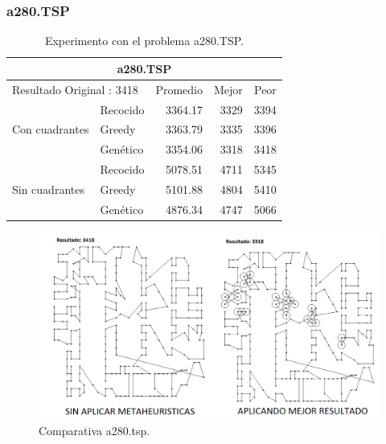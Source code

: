 
\subsubsection{a280.TSP}
\begin{table}[hbtp]
    \centering
    \caption{Experimento con el problema a280.TSP.}    
    \small
    \begin{tabular}{| l   l | r | r | r |   }
    \hline\multicolumn{5}{|c|}{ \rowcolor[gray]{0.8}a280.TSP} \\\hline
    \multicolumn{2}{|l|}{Resultado Original : 3418}   & Promedio & Mejor & Peor \\ 
                \hline
                & Recocido  &  3364.17 & 3329 & \cellcolor[gray]{0.9} 3394  \\ 
Con cuadrantes  & Greedy    &  3363.79 & 3335 & 3396  \\ 
                & Genético  & \cellcolor[gray]{0.9} 3354.06 & \cellcolor[gray]{0.9} 3318 & 3418 \\ 
                    \hline
                & Recocido  &  5078.51 & \cellcolor[gray]{0.9} 4711 & 5345   \\ 
Sin cuadrantes  & Greedy    &  5101.88 & 4804 & 5410   \\ 
                & Genético  &  \cellcolor[gray]{0.9} 4876.34 & 4747 & \cellcolor[gray]{0.9} 5066 \\ 
                    \hline
    \end{tabular}
    \label{table:EXP_a280.TSP}
\end{table}
 \begin{figure}[hbtp]
    \centering
        \includegraphics[width=1\textwidth]{PruebasResultados/Experimentos_Comparativas/a280.png}
        \caption{Comparativa a280.tsp.}
        \label{fig:a280_comparativa.png}
\end{figure}
